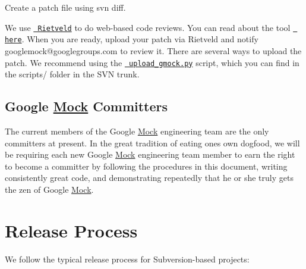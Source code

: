 \begin{DoxyEnumerate}
\item Create a patch file using {\ttfamily svn diff}.
\end{DoxyEnumerate}
\begin{DoxyEnumerate}
\item We use \href{http://codereview.appspot.com/}\texttt{ Rietveld} to do web-\/based code reviews. You can read about the tool \href{https://github.com/rietveld-codereview/rietveld/wiki}\texttt{ here}. When you are ready, upload your patch via Rietveld and notify {\ttfamily googlemock@googlegroups.\+com} to review it. There are several ways to upload the patch. We recommend using the \href{../scripts/upload_gmock.py}\texttt{ upload\+\_\+gmock.\+py} script, which you can find in the {\ttfamily scripts/} folder in the S\+VN trunk.
\end{DoxyEnumerate}

\subsection*{Google \mbox{\hyperlink{class_mock}{Mock}} Committers}

The current members of the Google \mbox{\hyperlink{class_mock}{Mock}} engineering team are the only committers at present. In the great tradition of eating one\textquotesingle{}s own dogfood, we will be requiring each new Google \mbox{\hyperlink{class_mock}{Mock}} engineering team member to earn the right to become a committer by following the procedures in this document, writing consistently great code, and demonstrating repeatedly that he or she truly gets the zen of Google \mbox{\hyperlink{class_mock}{Mock}}.

\section*{Release Process}

We follow the typical release process for Subversion-\/based projects\+:


